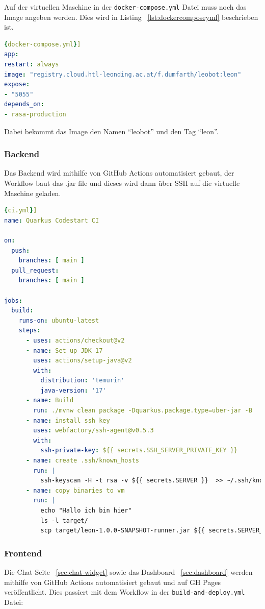 Auf der virtuellen Maschine in der \texttt{docker-compose.yml} Datei muss noch das Image angeben werden.
Dies wird in Listing ~\ref{lst:dockercomposeyml} beschrieben ist.

\begin{lstlisting}[language=yaml,label={lst:dockercomposeyml},caption={docker-compose.yml}]{docker-compose.yml}]
app:
restart: always
image: "registry.cloud.htl-leonding.ac.at/f.dumfarth/leobot:leon"
expose:
- "5055"
depends_on:
- rasa-production
\end{lstlisting}

Dabei bekommt das Image den Namen ``leobot'' und den Tag ``leon''.

\subsubsection{Backend}
Das Backend wird mithilfe von GitHub Actions automatisiert gebaut, der Workflow baut das .jar file und dieses wird dann über SSH auf die virtuelle Maschine geladen.

\begin{lstlisting}[language=yaml,label={lst:ciyml},caption={ci.yml}]{ci.yml}]
name: Quarkus Codestart CI

on:
  push:
    branches: [ main ]
  pull_request:
    branches: [ main ]

jobs:
  build:
    runs-on: ubuntu-latest
    steps:
      - uses: actions/checkout@v2
      - name: Set up JDK 17
        uses: actions/setup-java@v2
        with:
          distribution: 'temurin'
          java-version: '17'
      - name: Build
        run: ./mvnw clean package -Dquarkus.package.type=uber-jar -B
      - name: install ssh key
        uses: webfactory/ssh-agent@v0.5.3
        with:
          ssh-private-key: ${{ secrets.SSH_SERVER_PRIVATE_KEY }}
      - name: create .ssh/known_hosts
        run: |
          ssh-keyscan -H -t rsa -v ${{ secrets.SERVER }}  >> ~/.ssh/known_hosts
      - name: copy binaries to vm
        run: |
          echo "Hallo ich bin hier"
          ls -l target/
          scp target/leon-1.0.0-SNAPSHOT-runner.jar ${{ secrets.SERVER_USER }}@${{ secrets.SERVER }}:
\end{lstlisting}

\subsubsection{Frontend}
Die Chat-Seite ~\ref{sec:chat-widget} sowie das Dashboard ~\ref{sec:dashboard} werden mithilfe von GitHub Actions automatisiert gebaut und auf GH Pages veröffentlicht.
Dies passiert mit dem Workflow in der \texttt{build-and-deploy.yml} Datei:

